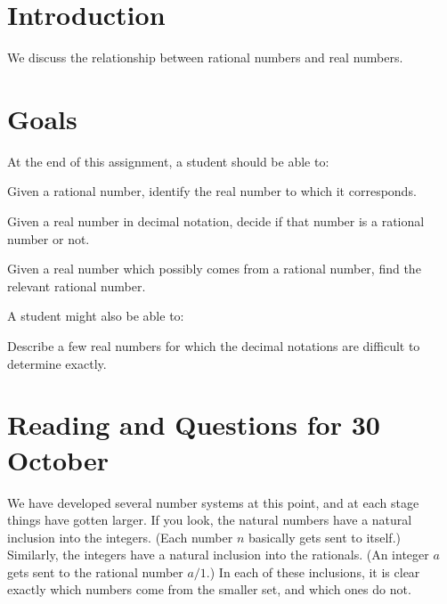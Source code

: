\documentclass[12pt,letterpaper]{article}
\theoremstyle{definition}
\begin{document}
\setlength{\parskip}{1ex plus 0.5ex minus 0.2ex}
\setlength{\parindent}{0pt}

\pagestyle{fancy}
\cfoot{}

\section*{Introduction}
We discuss the relationship between rational numbers and real numbers.

\section*{Goals}
At the end of this assignment, a student should be able to:
\begin{compactitem}
\item Given a rational number, identify the real number to which it corresponds.
\item Given a real number in decimal notation, decide if that number is a rational number or not.
\item Given a real number which possibly comes from a rational number, find the relevant rational number.
\end{compactitem}
A student might also be able to:
\begin{compactitem}
\item Describe a few real numbers for which the decimal notations are difficult to determine exactly.
\end{compactitem}

\section*{Reading and Questions for 30 October}

We have developed several number systems at this point, and at each stage things have gotten larger.
If you look, the natural numbers have a natural inclusion into the integers. 
(Each number $n$ basically gets sent to itself.)
Similarly, the integers have a natural inclusion into the rationals.
(An integer $a$ gets sent to the rational number $a/1$.)
In each of these inclusions, it is clear exactly which numbers come from the smaller set, and which ones do not.
\end{document}
